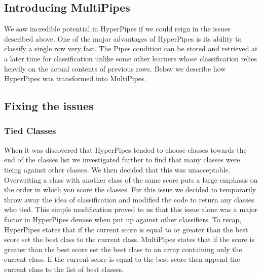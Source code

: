 \subsection{Introducing MultiPipes}
We saw incredible potential in HyperPipes if we could reign in
the issues described above. One of the major advantages of HyperPipes
is its ability to classify a single row very fast. The Pipes 
condition can be stored and retrieved at a later time for 
classification unlike some other learners whose classification 
relies heavily on the actual contents of previous rows. Below we 
describe how HyperPipes was transformed into MultiPipes.

\subsection{Fixing the issues}
\subsubsection{Tied Classes}
When it was discovered that HyperPipes tended to choose classes 
towards the end of the classes list we investigated further to 
find that many classes were tieing against other classes. We 
then decided that this was unacceptable. Overwriting a class 
with another class of the same score puts a large emphasis on 
the order in which you score the classes. For this issue we 
decided to temporarily throw away the idea of classification 
and modified the code to return any classes who tied. This 
simple modification proved to us that this issue alone was a 
major factor in HyperPipes demise when put up against other 
classifiers. To recap, HyperPipes states that if 
the current score is equal to or greater than the best score 
set the best class to the current class. MultiPipes states that if the score is greater than the 
best score set the best class to an array containing only the 
current class. If the current score is equal to the best score 
then append the current class to the list of best classes.


